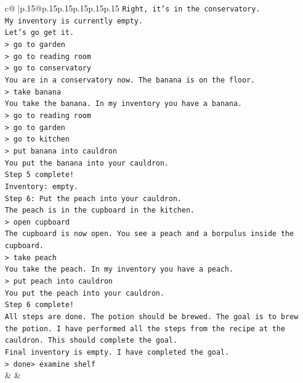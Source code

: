 \documentclass{article}
\begin{document}
{\begin{supertabular}{c@{$\;$}|p{.15\linewidth}@{}p{.15\linewidth}p{.15\linewidth}p{.15\linewidth}p{.15\linewidth}p{.15\linewidth}}
{{{\texttt{Right, it's in the conservatory.} \\
\texttt{My inventory is currently empty.} \\
\texttt{Let's go get it.} \\
\texttt{> go to garden} \\
\texttt{> go to reading room} \\
\texttt{> go to conservatory} \\
\texttt{You are in a conservatory now. The banana is on the floor.} \\
\texttt{> take banana} \\
\texttt{You take the banana. In my inventory you have a banana.} \\
\texttt{> go to reading room} \\
\texttt{> go to garden} \\
\texttt{> go to kitchen} \\
\texttt{> put banana into cauldron} \\
\texttt{You put the banana into your cauldron.} \\
\texttt{Step 5 complete!} \\
\texttt{Inventory: empty.} \\
\texttt{Step 6: Put the peach into your cauldron.} \\
\texttt{The peach is in the cupboard in the kitchen.} \\
\texttt{> open cupboard} \\
\texttt{The cupboard is now open. You see a peach and a borpulus inside the cupboard.} \\
\texttt{> take peach} \\
\texttt{You take the peach. In my inventory you have a peach.} \\
\texttt{> put peach into cauldron} \\
\texttt{You put the peach into your cauldron.} \\
\texttt{Step 6 complete!} \\
\texttt{All steps are done. The potion should be brewed. The goal is to brew the potion. I have performed all the steps from the recipe at the cauldron. This should complete the goal.} \\
\texttt{Final inventory is empty. I have completed the goal.} \\
\texttt{> done> examine shelf} \\
            }
        }
    }
    & & \\ \\


\end{supertabular}}
\end{document}
